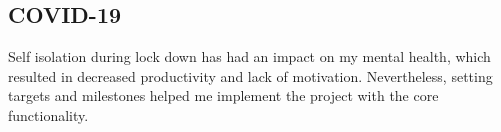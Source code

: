 \documentclass{article}
\begin{document}
\begin{appendicies}
\section*{COVID-19}
Self isolation during lock down has had an impact on my mental health, which resulted in decreased productivity and lack of motivation. Nevertheless, setting targets and milestones helped me implement the project with the core functionality.





\end{appendicies}

\end{document}
